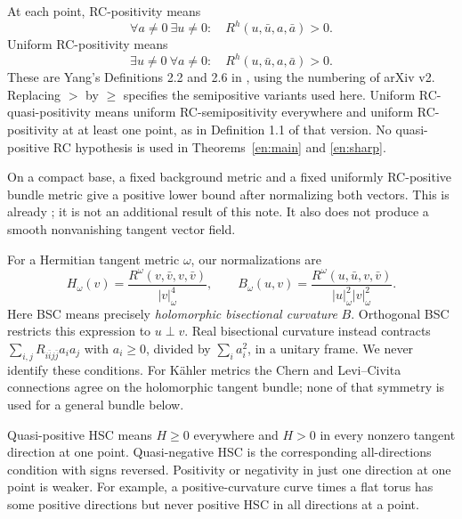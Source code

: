 \documentclass[12pt]{amsart}
\theoremstyle{definition}
\theoremstyle{remark}
\numberwithin{equation}{section}
\theoremstyle{definition}
\begin{document}
At each point, RC-positivity means
\begin{equation}\label{en:rc}
 \forall a\ne0\ \exists u\ne0:\quad
 R^h(u,\bar u,a,\bar a)>0.
\end{equation}
Uniform RC-positivity means
\begin{equation}\label{en:uniform}
 \exists u\ne0\ \forall a\ne0:\quad
 R^h(u,\bar u,a,\bar a)>0.
\end{equation}
These are Yang's Definitions 2.2 and 2.6 in \cite{en:Yan20}, using the
numbering of arXiv v2. Replacing $>$ by $\geq$ specifies the semipositive
variants used here. Uniform RC-quasi-positivity means uniform
RC-semipositivity everywhere and uniform RC-positivity at at least one
point, as in Definition 1.1 of that version. No quasi-positive RC
hypothesis is used in Theorems~\ref{en:main} and \ref{en:sharp}.

On a compact base, a fixed background metric and a fixed uniformly
RC-positive bundle metric give a positive lower bound after normalizing
both vectors. This is already \cite[Proposition 2.9]{en:Yan20}; it is not
an additional result of this note. It also does not produce a smooth
nonvanishing tangent vector field.

For a Hermitian tangent metric $\omega$, our normalizations are
\begin{equation}\label{en:hsc}
 H_\omega(v)=\frac{R^\omega(v,\bar v,v,\bar v)}{|v|_\omega^4},\qquad
 B_\omega(u,v)=\frac{R^\omega(u,\bar u,v,\bar v)}
 {|u|_\omega^2|v|_\omega^2}.
\end{equation}
Here BSC means precisely \emph{holomorphic bisectional curvature} $B$.
Orthogonal BSC restricts this expression to $u\perp v$. Real bisectional
curvature instead contracts $\sum_{i,j}R_{i\bar i j\bar j}a_i a_j$
with $a_i\geq0$, divided by $\sum_i a_i^2$, in a unitary frame. We never
identify these conditions. For K\"ahler metrics the Chern and
Levi--Civita connections agree on the holomorphic tangent bundle; none
of that symmetry is used for a general bundle below.

Quasi-positive HSC means $H\geq0$ everywhere and $H>0$ in every
nonzero tangent direction at one point. Quasi-negative HSC is the
corresponding all-directions condition with signs reversed. Positivity
or negativity in just one direction at one point is weaker. For example,
a positive-curvature curve times a flat torus has some positive
directions but never positive HSC in all directions at a point.
\end{document}
